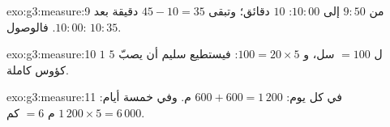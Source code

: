 \begin{solution}{exo:g3:measure:9}
من $9{:}50$ إلى $10{:}00$: $10$ دقائق؛ وتبقى
$45 - 10 = 35$ دقيقة بعد $10{:}00$. فالوصول: $10{:}35$.
\end{solution}

\begin{solution}{exo:g3:measure:10}
$1$ ل $= 100$ سل، و $100 = 20 \times 5$: فيستطيع سليم أن يصبّ $5$
كؤوس كاملة.
\end{solution}

\begin{solution}{exo:g3:measure:11}
في كل يوم: $600 + 600 = 1\,200$ م. وفي خمسة أيام:
$1\,200 \times 5 = 6\,000$ م $= 6$ كم.
\end{solution}
